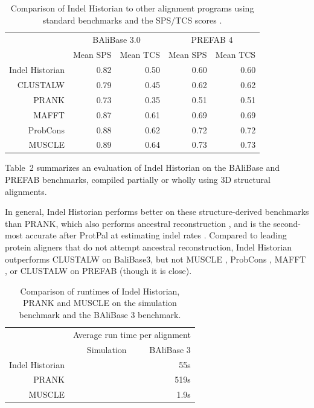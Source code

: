 \documentclass{bioinfo}
\begin{document}
\begin{table}
  \begin{tabular}{r|rr|rr}
    & \multicolumn{2}{c|}{BAliBase 3.0} & \multicolumn{2}{c}{PREFAB 4} \\
    & Mean SPS & Mean TCS & Mean SPS & Mean TCS \\
    \hline
Indel Historian & 0.82 & 0.50 & 0.60 & 0.60 \\
CLUSTALW & 0.79 & 0.45 & 0.62 & 0.62 \\
PRANK & 0.73 & 0.35 & 0.51 & 0.51 \\
MAFFT & 0.87 & 0.61 & 0.69 & 0.69 \\
ProbCons & 0.88 & 0.62 & 0.72 & 0.72 \\
MUSCLE & 0.89 & 0.64 & 0.73 & 0.73
  \end{tabular}
  \caption{
    Comparison of Indel Historian to other alignment programs using standard benchmarks
    and the SPS/TCS scores \citep{ThompsonEtAl2005}.
  }
\end{table}

Table~2 summarizes an evaluation of Indel Historian
on the BAliBase and PREFAB benchmarks,
compiled partially or wholly using 3D structural alignments.

In general, Indel Historian performs better on these structure-derived benchmarks than PRANK,
which also performs ancestral reconstruction \citep{LoytynojaGoldman2008},
and is the second-most accurate after ProtPal at estimating indel rates \citep{Westesson2012-zg}.
Compared to leading protein aligners that do not attempt ancestral reconstruction,
Indel Historian outperforms CLUSTALW \citep{LarkinEtAl2007} on BaliBase3, but not MUSCLE \citep{Edgar2004b},
ProbCons \citep{DoEtAl2005}, MAFFT \citep{KatohEtAl2005}, or CLUSTALW on PREFAB (though it is close).

\begin{table}
  \begin{tabular}{r|rr}
    & \multicolumn{2}{c}{Average run time per alignment} \\
 & Simulation & BAliBase 3 \\
    \hline
Indel Historian & & 55s \\
PRANK & & 519s \\
MUSCLE & & 1.9s \\
\end{tabular}
\caption{
    Comparison of runtimes of Indel Historian, PRANK and MUSCLE on the simulation benchmark and the BAliBase 3 benchmark.
  }
\end{table}
\end{document}
